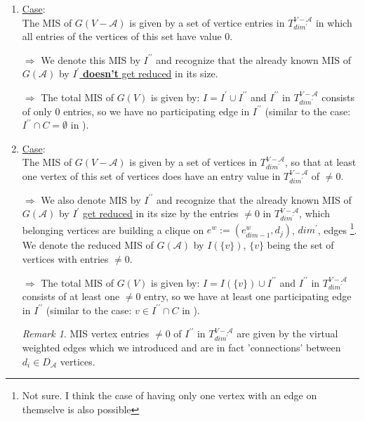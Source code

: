 \documentclass{article}
\newtheorem*{theorem A}{Theorem A}
\newtheorem*{theorem B}{N\"olker's Theorem}
\theoremstyle{remark}
\newtheorem{remark}{Remark}[section]
\theoremstyle{remark}
\begin{document}
\begin{enumerate}
    \item \underline{Case}:\\
        The MIS of $G\left(V - \mathcal{A}\right)$ is given by a set of vertice entries in $T^{V - \mathcal{A}}_{dim^{\prime}}$ in which all entries of the vertices of this set have value $0$.

        \vspace{0.3cm}
        $\Rightarrow$ We denote this MIS by $I^{\prime \prime}$ and recognize that the already known MIS of $G\left(\mathcal{A}\right)$ by \underline{$I^{\prime}$ \textbf{doesn't} get reduced} in its size.

        \vspace{0.3cm}
        $\Rightarrow$ The total MIS of $G\left(V\right)$ is given by: $I = I^{\prime} \cup I^{\prime \prime}$ and $I^{\prime \prime}$ in $T^{V - \mathcal{A}}_{dim^{\prime}}$ consists of only $0$ entries, so we have no participating edge in $I^{\prime \prime}$ (similar to the case: $I^{\prime \prime} \cap C = \emptyset$ in \cite{tarjan1985decomposition}).

    \item \underline{Case}:\\
        The MIS of $G\left(V - \mathcal{A}\right)$ is given by a set of vertices in $T^{V - \mathcal{A}}_{dim^{\prime}}$, so that at least one vertex of this set of vertices does have an entry value in $T^{V - \mathcal{A}}_{dim^{\prime}}$ of $\neq 0$.

        \vspace{0.3cm}
        $\Rightarrow$ We also denote MIS by $I^{\prime \prime}$ and recognize that the already known MIS of $G\left(\mathcal{A}\right)$ by $I^{\prime}$ \underline{get reduced} in its size by the entries $\neq 0$ in $T^{V - \mathcal{A}}_{dim^{\prime}}$, which belonging vertices are building a clique on $e^{w} := \left(e^{w}_{dim - 1}, d_{j}\right)$, $dim^{\prime}$, edges \footnote{Not sure. I think the case of having only one vertex with an edge on themselve is also possible}. We denote the reduced MIS of $G\left(\mathcal{A}\right)$ by $I\left(\{v\}\right)$, $\{v\}$ being the set of vertices with entries $\neq 0$.

        \vspace{0.3cm}
        $\Rightarrow$ The total MIS of $G\left(V\right)$ is given by: $I = I\left(\{ v \}\right) \cup I^{\prime \prime}$ and $I^{\prime \prime}$ in $T^{V - \mathcal{A}}_{dim^{\prime}}$ consists of at least one $\neq 0$ entry, so we have at least one participating edge in $I^{\prime \prime}$ (similar to the case: $v \in I^{\prime \prime} \cap C$ in \cite{tarjan1985decomposition}).

        \vspace{0.3cm}
        \begin{remark}
            MIS vertex entries $\neq 0$ of $I^{\prime \prime}$ in $T^{V - \mathcal{A}}_{dim^{\prime}}$ are given by the virtual weighted edges which we introduced and are in fact 'connections' between $d_{i} \in D_{\mathcal{A}}$ vertices.
        \label{remark:case2tarjan}
        \end{remark}
\label{enum:tarjandeco}
\end{enumerate}
\end{document}

